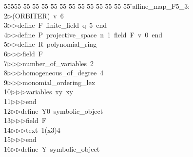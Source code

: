 %
%
\begin{tabbing}
55555 \= 55 \= 55 \= 55 \= 55 \= 55 \= 55 \= 55 \= 55 \= 55 \= 55 \= 55 \= 55 \= \>affine\_map\_F5\_3:\\[0pt]
2\>$\triangleright$\>(ORBITER)\ v\ 6\ \\[0pt]
3\>$\triangleright$\>$\triangleright$\>define\ F\ finite\_field\ q\ 5\ end\ \\[0pt]
4\>$\triangleright$\>$\triangleright$\>define\ P\ projective\_space\ n\ 1\ field\ F\ v\ 0\ end\ \\[0pt]
5\>$\triangleright$\>$\triangleright$\>define\ R\ polynomial\_ring\ \\[0pt]
6\>$\triangleright$\>$\triangleright$\>$\triangleright$\>field\ F\ \\[0pt]
7\>$\triangleright$\>$\triangleright$\>$\triangleright$\>number\_of\_variables\ 2\ \\[0pt]
8\>$\triangleright$\>$\triangleright$\>$\triangleright$\>homogeneous\_of\_degree\ 4\ \\[0pt]
9\>$\triangleright$\>$\triangleright$\>$\triangleright$\>monomial\_ordering\_lex\ \\[0pt]
10\>$\triangleright$\>$\triangleright$\>$\triangleright$\>variables\ xy\ xy\ \\[0pt]
11\>$\triangleright$\>$\triangleright$\>$\triangleright$\>end\ \\[0pt]
12\>$\triangleright$\>$\triangleright$\>define\ Y0\ symbolic\_object\ \\[0pt]
13\>$\triangleright$\>$\triangleright$\>$\triangleright$\>field\ F\ \\[0pt]
14\>$\triangleright$\>$\triangleright$\>$\triangleright$\>text\ 1(x3)4\ \\[0pt]
15\>$\triangleright$\>$\triangleright$\>$\triangleright$\>end\ \\[0pt]
16\>$\triangleright$\>$\triangleright$\>define\ Y\ symbolic\_object\ \\[0pt]

\end{tabbing}
